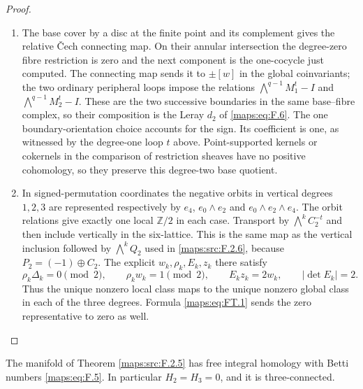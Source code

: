 \begin{proof}
\begin{enumerate}[label=\arabic*.]
\item The base cover by a disc at the finite point and its
complement gives the relative \v{C}ech connecting map.  On their
annular intersection the degree-zero fibre restriction is zero and
the next component is the one-cocycle just computed.
The connecting map sends it to $\pm[w]$ in the global coinvariants;
the two ordinary peripheral loops impose the relations
$\bigwedge^{q-1}M_1^t-I$ and $\bigwedge^{q-1}M_2^t-I$.
These are the two successive boundaries in the same base--fibre
complex, so their composition is the Leray $d_2$ of
\eqref{maps:eq:F.6}.  The one boundary-orientation choice accounts
for the sign.  Its coefficient is one, as witnessed by the
degree-one loop $t$ above.  Point-supported kernels or cokernels in
the comparison of restriction sheaves have no positive cohomology,
so they preserve this degree-two base quotient.

\item In signed-permutation coordinates the negative orbits in
vertical degrees $1,2,3$ are represented respectively by
$e_4$, $e_0\wedge e_2$ and $e_0\wedge e_2\wedge e_4$.
The orbit relations give exactly one local $\mathbb Z/2$ in each
case.  Transport by $\bigwedge^kC_2^{-t}$ and then include vertically
in the six-lattice.  This is the same map as the vertical inclusion
followed by $\bigwedge^kQ_2$ used in
\cref{maps:src:F.2.6}, because $P_2=(-1)\oplus C_2$.
The explicit $w_k,\rho_k,E_k,z_k$ there satisfy
\[
 \rho_k\Delta_k=0\pmod2,\qquad
 \rho_kw_k=1\pmod2,\qquad E_kz_k=2w_k,
 \qquad |\det E_k|=2.
\]
Thus the unique nonzero local class maps to the unique nonzero
global class in each of the three degrees.  Formula
\eqref{maps:eq:FT.1} sends the zero representative to zero as well.
\end{enumerate}
\end{proof}




\begin{theorem}\label{maps:src:F.2.6}


The manifold of Theorem \ref{maps:src:F.2.5} has free integral homology with
Betti numbers \eqref{maps:eq:F.5}.  In particular $H_2=H_3=0$, and it is
three-connected.

\end{theorem}


